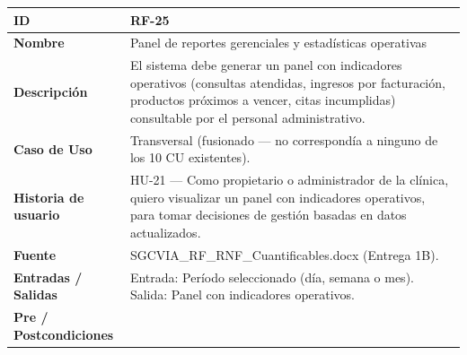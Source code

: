 \documentclass[
]{article}
\newcounter{none} %
\begin{document}
{\def\LTcaptype{none} %
\begin{longtable}[]{|
  >{\raggedright\arraybackslash}p{}|
  >{\raggedright\arraybackslash}p{}|}
\hline
\begin{minipage}[b]{\linewidth}\raggedright
\textbf{ID}
\end{minipage} & \begin{minipage}[b]{\linewidth}\raggedright
RF-25
\end{minipage} \\
\hline
\endhead
\hline
\endlastfoot
\textbf{Nombre} & \begin{minipage}[t]{\linewidth}\raggedright
Panel de reportes gerenciales y estadísticas operativas
\end{minipage} \\
\hline
\textbf{Descripción} & \begin{minipage}[t]{\linewidth}\raggedright
El sistema debe generar un panel con indicadores operativos (consultas atendidas, ingresos por facturación, productos próximos a vencer, citas incumplidas) consultable por el personal administrativo.
\end{minipage} \\
\hline
\textbf{Caso de Uso} & \begin{minipage}[t]{\linewidth}\raggedright
Transversal (fusionado — no correspondía a ninguno de los 10 CU existentes).
\end{minipage} \\
\hline
\textbf{Historia de usuario} & \begin{minipage}[t]{\linewidth}\raggedright
HU-21 — Como propietario o administrador de la clínica, quiero visualizar un panel con indicadores operativos, para tomar decisiones de gestión basadas en datos actualizados.
\end{minipage} \\
\hline
\textbf{Fuente} & \begin{minipage}[t]{\linewidth}\raggedright
SGCVIA\_RF\_RNF\_Cuantificables.docx (Entrega 1B).
\end{minipage} \\
\hline
\textbf{Entradas / Salidas} & \begin{minipage}[t]{\linewidth}\raggedright
Entrada: Período seleccionado (día, semana o mes). Salida: Panel con indicadores operativos.
\end{minipage} \\
\hline
\textbf{Pre / Postcondiciones} & \begin{minipage}[t]{\linewidth}\raggedright

\end{minipage}
\end{longtable}}
\end{document}
